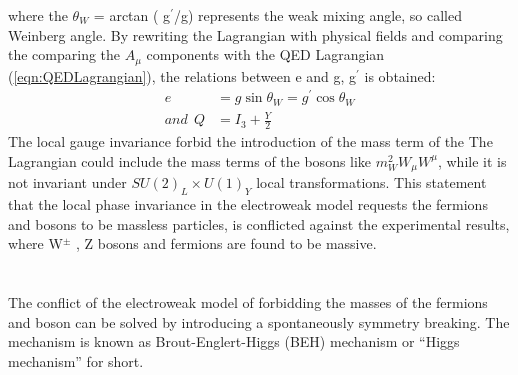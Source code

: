 where the $\theta_{W}$ = arctan ( g$^{\prime}$/g) represents the weak mixing angle, so called Weinberg angle. By rewriting the Lagrangian with physical fields and comparing the comparing the $A_{\mu}$ components with the QED Lagrangian (\ref{eqn:QEDLagrangian}), the relations between e and g, g$^{\prime}$ is obtained:
\begin{equation}
\begin{aligned}
e&=g \sin \theta_{W}=g^{\prime} \cos \theta_{W} \\
and \ \ Q&=I_{3}+\frac{Y}{2}
\end{aligned}
\end{equation}
The local gauge invariance forbid the introduction of the mass term of the 
The Lagrangian could include the mass terms of the bosons like $m^2_W W_\mu W^\mu$, while it is not invariant under $SU(2)_L \times U(1)_Y$ local transformations.
This statement that the local phase invariance in the electroweak model requests the fermions and bosons to be massless particles, is conflicted against the experimental results, where W$^{\pm}$ , Z bosons and fermions are found to be massive.
\\ \\
\noindent\textbf{} \\ 
The conflict of the electroweak model of forbidding the masses of the fermions and boson can be solved by introducing a spontaneously symmetry breaking.
The mechanism is known as Brout-Englert-Higgs (BEH) mechanism or “Higgs mechanism” for short.

